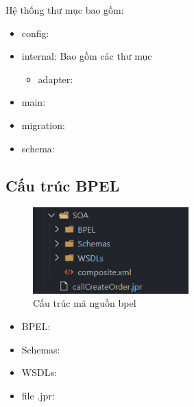 Hệ thống thư mục bao gồm:
\begin{itemize}
    \item config:
    \item internal: Bao gồm các thư mục
          \begin{itemize}
              \item adapter:
          \end{itemize}
    \item main:
    \item migration:
    \item schema:
\end{itemize}

\subsection{Cấu trúc BPEL}

\begin{figure}[!htp]
    \begin{center}
        \includegraphics[width=6cm]{img/file-structure/bpel.png}
    \end{center}
    \caption{Cấu trúc mã nguồn bpel}
\end{figure}

\begin{itemize}
    \item BPEL:
    \item Schemas:
    \item WSDLs:
    \item file .jpr:
\end{itemize}